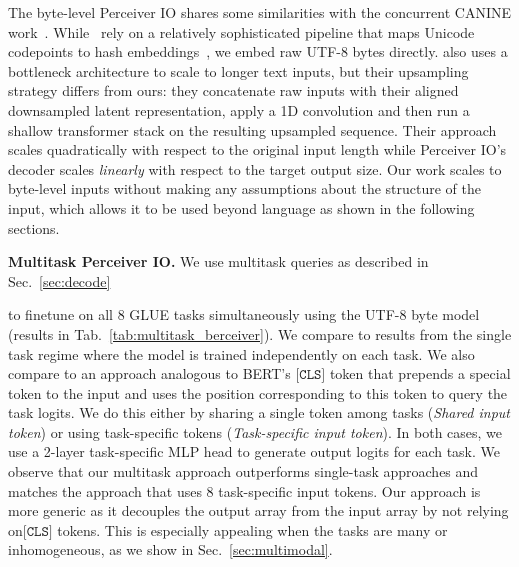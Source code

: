 \documentclass{article} %
\newcommand{\ourmodel}{Perceiver IO\xspace}
\begin{document}
The byte-level \ourmodel{} shares some similarities with the concurrent CANINE work~\citep{clark2021canine}.
While~\cite{clark2021canine} rely on a relatively sophisticated pipeline that maps Unicode codepoints to hash embeddings~\citep{svenstrup17hash}, we embed raw UTF-8 bytes directly. \cite{clark2021canine} also uses a bottleneck architecture to scale to longer text inputs, but their upsampling strategy differs from ours: they concatenate raw inputs with their aligned downsampled latent representation, apply a 1D convolution and then run a shallow transformer stack on the resulting upsampled sequence. Their approach scales quadratically with respect to the original input length while \ourmodel{}'s decoder scales \emph{linearly} with respect to the target output size. Our work scales to byte-level inputs without making any assumptions about the structure of the input, which allows it to be used beyond language as shown in the following sections.

\noindent
\textbf{Multitask \ourmodel{}.}
We use multitask queries as described in Sec.~\ref{sec:decode} 
\begin{table}
        \centering
        \caption{\small Multitask \ourmodel{}. Results use the same metric as Tab.~\ref{tab:language_res} (higher is better).}
        \label{tab:multitask_berceiver}
\end{table}
to finetune on all 8 GLUE tasks simultaneously using the UTF-8 byte model (results in Tab.~\ref{tab:multitask_berceiver}). We compare to results from the single task regime where the model is trained independently on each task. 
We also compare to an approach analogous to BERT's $\texttt{[CLS]}$ token that prepends a special token to the input and uses the position corresponding to this token to query the task logits.
We do this either by sharing a single token among tasks (\emph{Shared input token}) or using task-specific tokens (\emph{Task-specific input token}).
In both cases, we use a 2-layer task-specific MLP head to generate output logits for each task. 
We observe that our multitask approach outperforms single-task approaches and matches the approach that uses 8 task-specific input tokens. 
Our approach is more generic as it decouples the output array from the input array by not relying on$\texttt{[CLS]}$ tokens. 
This is especially appealing when the tasks are many or inhomogeneous, as we show in Sec.~\ref{sec:multimodal}.
\end{document}
